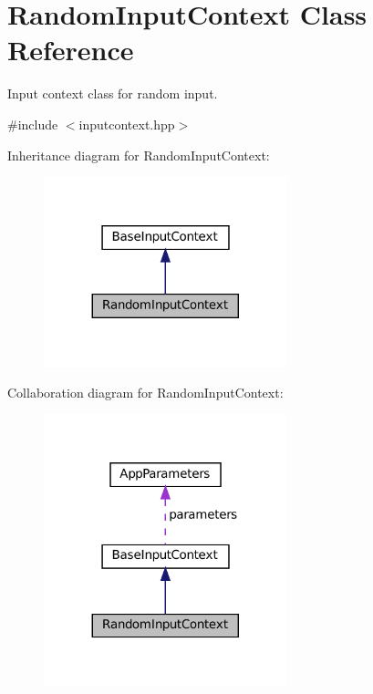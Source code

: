 \hypertarget{classRandomInputContext}{}\section{Random\+Input\+Context Class Reference}
\label{classRandomInputContext}


Input context class for random input.  




{\ttfamily \#include $<$inputcontext.\+hpp$>$}



Inheritance diagram for Random\+Input\+Context\+:\nopagebreak
\begin{figure}[H]
\begin{center}
\leavevmode
\includegraphics[width=200pt]{classRandomInputContext__inherit__graph}
\end{center}
\end{figure}


Collaboration diagram for Random\+Input\+Context\+:\nopagebreak
\begin{figure}[H]
\begin{center}
\leavevmode
\includegraphics[width=200pt]{classRandomInputContext__coll__graph}
\end{center}
\end{figure}
